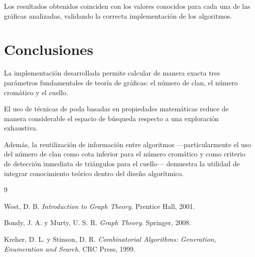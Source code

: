 \documentclass[12pt]{article}
\begin{document}
Los resultados obtenidos coinciden con los valores conocidos para cada una de las
gráficas analizadas, validando la correcta implementación de los algoritmos.

\section{Conclusiones}

La implementación desarrollada permite calcular de manera exacta tres parámetros
fundamentales de teoría de gráficas: el número de clan, el número cromático y el
cuello.

El uso de técnicas de poda basadas en propiedades matemáticas reduce de manera
considerable el espacio de búsqueda respecto a una exploración exhaustiva.

Además, la reutilización de información entre algoritmos ---particularmente el uso
del número de clan como cota inferior para el número cromático y como criterio de
detección inmediata de triángulos para el cuello--- demuestra la utilidad de integrar
conocimiento teórico dentro del diseño algorítmico.

\begin{thebibliography}{9}

West, D. B.
\textit{Introduction to Graph Theory}.
Prentice Hall, 2001.

Bondy, J. A. y Murty, U. S. R.
\textit{Graph Theory}.
Springer, 2008.

Kreher, D. L. y Stinson, D. R.
\textit{Combinatorial Algorithms:
Generation, Enumeration and Search}.
CRC Press, 1999.

\end{thebibliography}
\end{document}
